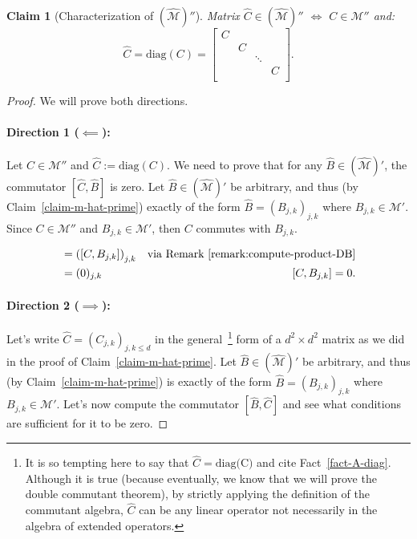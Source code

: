 \documentclass[12pt]{article}
\theoremstyle{plain}
\newtheorem{claim}[theorem]{Claim}
\begin{document}
\begin{claim}[Characterization of $(\widehat{\mathcal{M}})''$]\label{claim-m-hat-double-prime}
    Matrix $\widehat{C} \in (\widehat{\mathcal{M}})''$ $\iff$ $C \in \mathcal{M}''$ and:
    \begin{equation}
        \widehat{C} = \text{diag}(C) = 
    \begin{bmatrix}
    C & \\
    & C \\
    & & \ddots\\
    & & & C\\
    \end{bmatrix}.
    \end{equation}
\end{claim}
\begin{proof}
We will prove both directions.

\paragraph{Direction 1 ($\impliedby$):}
Let $C \in \mathcal{M}''$ and $\widehat{C} := \text{diag}(C)$. We need to prove that for any $\widehat{B} \in (\widehat{\mathcal{M}})'$, the commutator $[\widehat{C}, \widehat{B}]$ is zero. Let $\widehat{B} \in (\widehat{\mathcal{M}})'$ be arbitrary, and thus (by Claim~\ref{claim-m-hat-prime}) exactly of the form $\widehat{B} = \left(B_{j,k}\right)_{j,k}$ where $B_{j,k} \in \mathcal{M}'$. Since $C \in \mathcal{M}''$ and $B_{j,k} \in \mathcal{M}'$, then $C$ commutes with $B_{j,k}$.

\begin{align*}
    [\widehat{C}, \widehat{B}] &= \left([C, B_{j,k}]\right)_{j,k} & \text{via Remark~\ref{remark:compute-product-DB}}\\ 
    &= (0)_{j,k} & [C, B_{j,k}] = 0.
\end{align*}

\paragraph{Direction 2 ($\implies$):}

    Let's write $\widehat{C} = \left(C_{j,k}\right)_{j,k \leq d}$ in the general~\footnote{It is so tempting here to say that $\widehat{C} = \text{diag(C)}$ and cite Fact~\ref{fact-A-diag}. Although it is true (because eventually, we know that we will prove the double commutant theorem), by strictly applying the definition of the commutant algebra, $\widehat{C}$ can be any linear operator not necessarily in the algebra of extended operators.} form of a $d^2 \times d^2$ matrix as we did in the proof of Claim~\ref{claim-m-hat-prime}. Let $\widehat{B} \in (\widehat{\mathcal{M}})'$ be arbitrary, and thus (by Claim~\ref{claim-m-hat-prime}) is exactly of the form $\widehat{B} = \left(B_{j,k}\right)_{j,k}$ where $B_{j,k} \in \mathcal{M}'$. Let's now compute the commutator $[\widehat{B}, \widehat{C}]$ and see what conditions are sufficient for it to be zero.


\end{proof}
\end{document}
